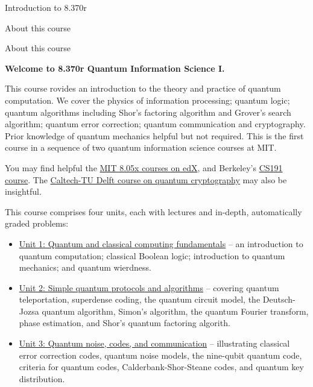 

\begin{edXsection}{Introduction to 8.370r}

\begin{edXtext}{About this course}

{\LARGE About this course}

{\noindent\bf\Large Welcome to 8.370r Quantum Information Science I.}

This course rovides an introduction to the theory and practice of quantum
computation. We cover the physics of information processing;
quantum logic; quantum algorithms including Shor's factoring algorithm
and Grover's search algorithm; quantum error correction; quantum
communication and cryptography. Prior knowledge of quantum mechanics
helpful but not required. This is the first course in a sequence of two
quantum information science courses at MIT.

You may find helpful the
\href{https://www.edx.org/course/mastering-quantum-mechanics-part-1-wave-mitx-8-05-1x}{MIT
  8.05x courses on edX}, and Berkeley's
\href{https://www.edx.org/course/quantum-mechanics-quantum-computation-uc-berkeleyx-cs-191x}{CS191
  course}.  The
\href{https://www.edx.org/course/quantum-cryptography-caltechx-delftx-qucryptox}{Caltech-TU
  Delft course on quantum cryptography} may also be insightful.

This course comprises four units, each with lectures and
in-depth, automatically graded problems:
\begin{itemize}
\item{\href{/course/courseware/unit1}{Unit 1: Quantum and classical
    computing fundamentals}} -- an introduction to quantum computation;
  classical Boolean logic; introduction to quantum mechanics; and
  quantum wierdness.

\item{\href{/course/courseware/unit2}{Unit 2: Simple quantum protocols
    and algorithms}} -- covering quantum teleportation, superdense
  coding, the quantum circuit model, the Deutsch-Jozsa quantum
  algorithm, Simon's algorithm, the quantum Fourier transform, phase
  estimation, and Shor's quantum factoring algorith.

\item{\href{/course/courseware/unit3}{Unit 3: Quantum noise, codes,
    and communication}} -- illustrating classical error correction
  codes, quantum noise models, the nine-qubit quantum code, criteria
  for quantum codes, Calderbank-Shor-Steane codes, and quantum key
  distribution.


\end{itemize}
\end{edXtext}
\end{edXsection}
